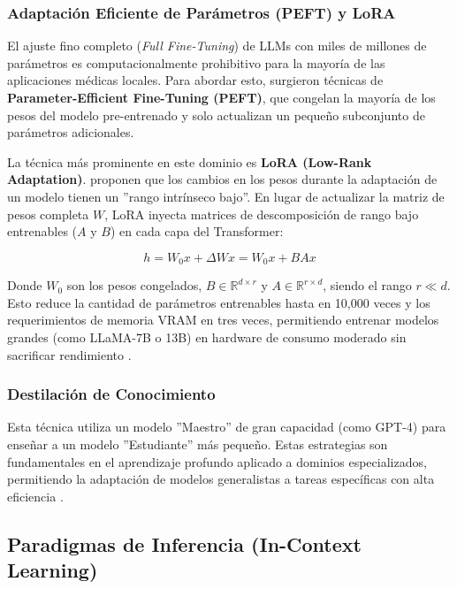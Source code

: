 \documentclass[11pt, a4paper]{article}
\begin{document}
\subsubsection{Adaptación Eficiente de Parámetros (PEFT) y LoRA}

El ajuste fino completo (\textit{Full Fine-Tuning}) de LLMs con miles de millones de parámetros es computacionalmente prohibitivo para la mayoría de las aplicaciones médicas locales. Para abordar esto, surgieron
técnicas de \textbf{Parameter-Efficient Fine-Tuning (PEFT)}, que congelan la mayoría de los pesos del modelo pre-entrenado y solo actualizan un pequeño subconjunto de parámetros adicionales.

La técnica más prominente en este dominio es \textbf{LoRA (Low-Rank Adaptation)}. \cite{hu_lora_2021} proponen que los cambios en los pesos durante la adaptación de un modelo tienen un ''rango intrínseco bajo''. En
lugar de actualizar la matriz de pesos completa $W$, LoRA inyecta matrices de descomposición de rango bajo entrenables ($A$ y $B$) en cada capa del Transformer:

\begin{equation}
    h = W_0x + \Delta Wx = W_0x + BAx
\end{equation}

Donde $W_0$ son los pesos congelados, $B \in \mathbb{R}^{d \times r}$ y $A \in \mathbb{R}^{r \times d}$, siendo el rango $r \ll d$. Esto reduce la cantidad de parámetros entrenables hasta en 10,000 veces y los
requerimientos de memoria VRAM en tres veces, permitiendo entrenar modelos grandes (como LLaMA-7B o 13B) en hardware de consumo moderado sin sacrificar rendimiento \cite{hu_lora_2021}.

\subsubsection{Destilación de Conocimiento}
Esta técnica utiliza un modelo ''Maestro'' de gran capacidad (como GPT-4) para enseñar a un modelo ''Estudiante'' más pequeño. Estas estrategias son fundamentales en el aprendizaje profundo aplicado a dominios especializados,
 permitiendo la adaptación de modelos generalistas a tareas específicas con alta eficiencia \cite{hinton_distilling_2015}.



\subsection{Paradigmas de Inferencia (In-Context Learning)}
\end{document}
